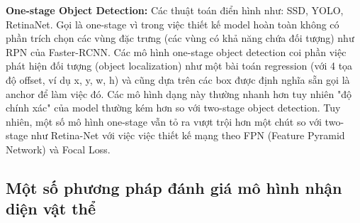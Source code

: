 \documentclass[a4paper, 12pt]{report}
\begin{document}
\textbf{One-stage Object Detection:} Các thuật toán điển hình như: SSD, YOLO, RetinaNet. Gọi là one-stage vì trong việc thiết kế model hoàn toàn không có phần trích chọn các vùng đặc trưng (các vùng có khả năng chứa đối tượng) như RPN của Faster-RCNN. Các mô hình one-stage object detection coi phần việc phát hiện đối tượng (object localization) như một bài toán regression (với 4 tọa độ offset, ví dụ x, y, w, h) và cũng dựa trên các box được định nghĩa sẵn gọi là anchor để làm việc đó. Các mô hình dạng này thường nhanh hơn tuy nhiên "độ chính xác" của model thường kém hơn so với two-stage object detection. Tuy nhiên, một số mô hình one-stage vẫn tỏ ra vượt trội hơn một chút so với two-stage như Retina-Net với việc việc thiết kế mạng theo FPN (Feature Pyramid Network) và Focal Loss.\par

\subsection{Một số phương pháp đánh giá mô hình nhận diện vật thể}
\end{document}
